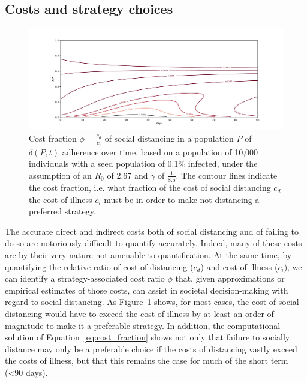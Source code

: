 \documentclass[12pt]{article}
\begin{document}

\subsection{Costs and strategy choices} %
\label{sub:costs_and_strategy_choices}


\begin{figure}
	\includegraphics[width=\linewidth]{figures/cost_fraction}
	\caption{Cost fraction $\phi = \frac{c_d}{c_i}$ of social distancing in a population $P$ of $\delta(P, t)$ adherence over time, based on a population of 10,000 individuals with a seed population of 0.1\% infected, under the assumption of an $R_0$ of 2.67 and $\gamma$ of $\frac{1}{8.5}$. The contour lines indicate the cost fraction, i.e. what fraction of the cost of social distancing $c_d$ the cost of illness $c_i$ must be in order to make not distancing a preferred strategy.}
	\label{fig:cost_fraction}
\end{figure}

The accurate direct and indirect costs both of social distancing and of failing to do so are notoriously difficult to quantify accurately. Indeed, many of these costs are by their very nature not amenable to quantification. At the same time, by quantifying the relative ratio of cost of distancing ($c_d$) and cost of illness ($c_i$), we can identify a strategy-associated cost ratio $\phi$ that, given approximations or empirical estimates of those costs, can assist in societal decision-making with regard to social distancing. As Figure~\ref{fig:cost_fraction} shows, for most cases, the cost of social distancing would have to exceed the cost of illness by at least an order of magnitude to make it a preferable strategy. In addition, the computational solution of Equation~\eqref{eq:cost_fraction} shows not only that failure to socially distance may only be a preferable choice if the costs of distancing vastly exceed the costs of illness, but that this remains the case for much of the short term (<90 days). 
\end{document}
